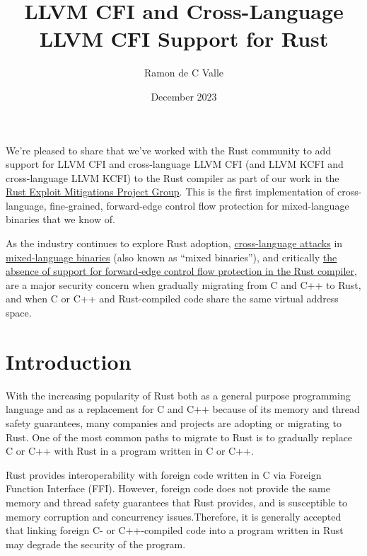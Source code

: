 \documentclass{article}
\title{LLVM CFI and Cross-Language LLVM CFI Support for Rust}
\author{Ramon de C Valle}
\date{December 2023}
\begin{document}
   \maketitle

We’re pleased to share that we’ve worked with the Rust community to add support for LLVM CFI and cross-language LLVM CFI (and LLVM KCFI and cross-language LLVM KCFI) to the Rust compiler as part of our work in the \href{https://www.rust-lang.org/governance/teams/compiler#Exploit%20Mitigations%20Project%20Group}{Rust Exploit Mitigations Project Group}. This is the first implementation of cross-language, fine-grained, forward-edge control flow protection for mixed-language binaries that we know of.

As the industry continues to explore Rust adoption, \href{https://www.ndss-symposium.org/wp-content/uploads/2022-78-paper.pdf}{cross-language attacks} in \href{https://dl.acm.org/doi/pdf/10.1145/3418898}{mixed-language binaries} (also known as “mixed binaries”), and critically \href{https://rcvalle.com/docs/rust-cfi-design-doc.pdf}{the absence of support for forward-edge control flow protection in the Rust compiler}, are a major security concern when gradually migrating from C and C++ to Rust, and when C or C++ and Rust-compiled code share the same virtual address space.


\section{Introduction}

With the increasing popularity of Rust both as a general purpose programming language and as a replacement for C and C++ because of its memory and thread safety guarantees, many companies and projects are adopting or migrating to Rust. One of the most common paths to migrate to Rust is to gradually replace C or C++ with Rust in a program written in C or C++.

Rust provides interoperability with foreign code written in C via Foreign Function Interface (FFI). However, foreign code does not provide the same memory and thread safety guarantees that Rust provides, and is susceptible to memory corruption and concurrency issues.\footnotemark[1] Therefore, it is generally accepted that linking foreign C- or C++-compiled code into a program written in Rust may degrade the security of the program.

\end{document}
